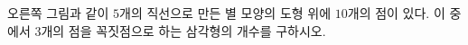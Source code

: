 \hspace*{2mm}\begin{minipage}[t]{\dimexpr\linewidth-2mm\relax}\vspace{0pt}
\noindent\begin{minipage}[t]{0.58\linewidth}\vspace{0pt}\raggedright 오른쪽 그림과 같이 $5$개의 직선으로 만든 별 모양의 도형 위에 $10$개의 점이 있다. 이 중에서 $3$개의 점을 꼭짓점으로 하는 삼각형의 개수를 구하시오.\end{minipage}\hfill\begin{minipage}[t]{0.4\linewidth}\vspace{0pt}\centering \resizebox{\ifdim\width>\linewidth\linewidth\else\width\fi}{!}{}\end{minipage}\par\end{minipage}
